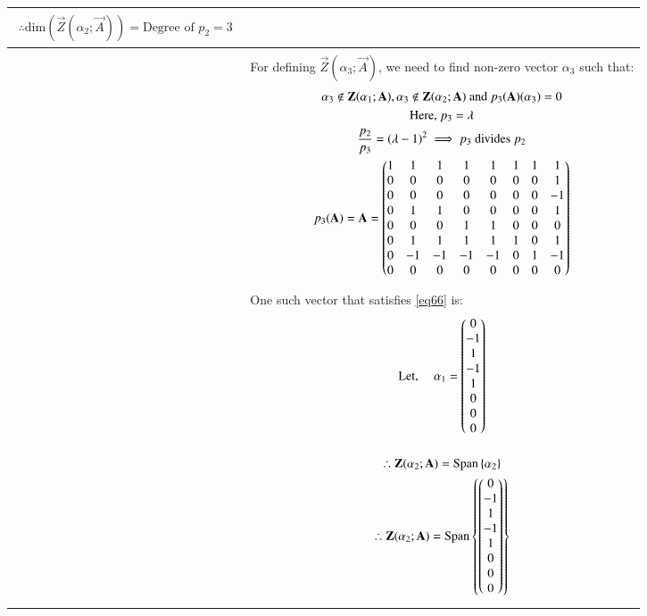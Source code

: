 \documentclass[journal,12pt]{IEEEtran}
\begin{document}
\begin{longtable}{|p{4cm}|p{14cm}|}
\begin{gather}
        \therefore \text{dim}(\vec{Z}(\alpha_2;\vec{A}))= \text{Degree of $p_2$}=3
        \end{gather}\\
        \hline
        &\\
        &For defining $\vec{Z}(\alpha_3;\vec{A})$, we need to find non-zero vector $\alpha_3$ such that: 
        \begin{gather}
        \alpha_3 \notin \mathbf{Z}(\alpha_1;\mathbf{A}),\alpha_3 \notin \mathbf{Z}(\alpha_2;\mathbf{A}) \text{ and }p_3(\mathbf{A})(\alpha_3)=0 \label{eq66}\\
        \text{Here, }p_3=\lambda \\
        \frac{p_2}{p_3}=(\lambda-1)^2 \implies p_3 \text{ divides }p_2 \\
        p_3(\mathbf{A})=\mathbf{A}=\begin{pmatrix} 
1 &1  &1  &1  &1  &1  &1  &1 \\ 
 0&0  &0  &0  &0  &0  &0  &1 \\ 
0 &0  &0  &0  &0  &0  &0  &-1 \\ 
0 &1  &1  &0  &0  &0  &0  &1 \\ 
0 &0  &0  &1  &1  &0  &0  &0 \\ 
0 &1  &1  &1  &1  &1  &0  &1 \\ 
0 &-1  &-1  &-1  &-1  &0  &1  &-1 \\ 
0 &0  &0  &0  &0  &0  &0  &0 \end{pmatrix}
        \end{gather}\\
         & One such vector that satisfies \eqref{eq66} is:
         \begin{gather}
        \text{Let,  } \quad \alpha_1=\begin{pmatrix}0\\-1\\1\\-1\\1\\0\\0\\0\end{pmatrix}
        \end{gather}\\
        &\begin{gather}
        \therefore \vec{Z}(\alpha_2;\vec{A})=\text{Span}\cbrak{\alpha_2}\\
         \therefore \vec{Z}(\alpha_2;\vec{A})=\text{Span}\cbrak{\myvec{0\\-1\\1\\-1\\1\\0\\0\\0}}\\

\end{gather}
\end{longtable}
\end{document}
